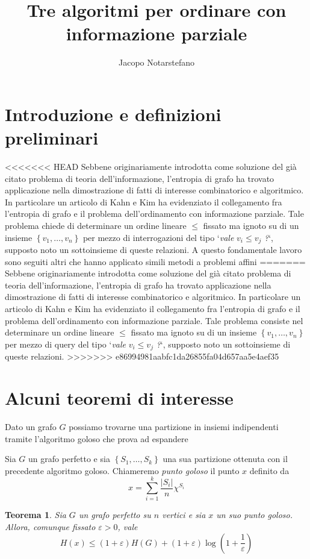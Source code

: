 \documentclass[12pt]{article}
\title{Tre algoritmi per ordinare con informazione parziale}
\author{Jacopo Notarstefano}
\newtheorem{theorem}{Teorema}[section]
\newenvironment{definition}[1][Definizione.]{ 
\begin{trivlist}
	\item[\hskip \labelsep {\bfseries #1}]}{ 
\end{trivlist}
}
\begin{document}
\ifpdf {} \else {} \fi

\maketitle

\section{Introduzione e definizioni preliminari}

<<<<<<< HEAD
Sebbene originariamente introdotta come soluzione del già citato problema di teoria dell'informazione, l'entropia di grafo ha trovato applicazione nella dimostrazione di fatti di interesse combinatorico e algoritmico. In particolare un articolo di Kahn e Kim ha evidenziato il collegamento fra l'entropia di grafo e il problema dell'ordinamento con informazione parziale. Tale problema chiede di determinare un ordine lineare \(\le\) fissato ma ignoto su di un insieme \(\left\{v_1,\dots,v_n\right\}\) per mezzo di interrogazioni del tipo `\emph{vale} \(v_i\le v_j\) \emph{?}`, supposto noto un sottoinsieme di queste relazioni. A questo fondamentale lavoro sono seguiti altri che hanno applicato simili metodi a problemi affini
=======
Sebbene originariamente introdotta come soluzione del già citato problema di teoria dell'informazione, l'entropia di grafo ha trovato applicazione nella dimostrazione di fatti di interesse combinatorico e algoritmico. In particolare un articolo di Kahn e Kim ha evidenziato il collegamento fra l'entropia di grafo e il problema dell'ordinamento con informazione parziale. Tale problema consiste nel determinare un ordine lineare \(\le\) fissato ma ignoto su di un insieme \(\left\{v_1,\dots,v_n\right\}\) per mezzo di query del tipo `\emph{vale} \(v_i\le v_j\) \emph{?}`, supposto noto un sottoinsieme di queste relazioni.
>>>>>>> e86994981aabfc1da26855fa04d657aa5e4aef35

\section{Alcuni teoremi di interesse}

Dato un grafo \(G\) possiamo trovarne una partizione in insiemi indipendenti tramite l'algoritmo goloso che prova ad espandere 
\begin{definition}
	Sia \(G\) un grafo perfetto e sia \(\left\{S_1,\dots,S_k\right\}\) una sua partizione ottenuta con il precedente algoritmo goloso. Chiameremo \emph{punto goloso} il punto \(x\) definito da
	\[x=\sum_{i=1}^k\frac{|S_i|}{n}\chi^{S_i}\]
\end{definition}
\begin{theorem}
	Sia \(G\) un grafo perfetto su \(n\) vertici e sia \(x\) un suo punto goloso. Allora, comunque fissato \(\varepsilon>0\), vale
	\[H(x)\le(1+\varepsilon)H(G)+(1+\varepsilon)\log\left(1+\frac{1}{\varepsilon}\right)\]
\end{theorem}
\end{document}
